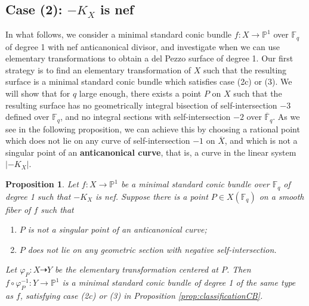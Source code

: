 \documentclass[a4paper, 11pt, reqno]{amsart}
\numberwithin{equation}{section} \numberwithin{figure}{section}
\newcommand{\term}[1]{\textbf{#1}}          %
\def \F {{\mathbb F}}
\def \P {{\mathbb P}}
\newcommand{\ra}{\rightarrow}
\newtheorem{proposition}[lemma]{Proposition}
\newtheorem{corollary}[lemma]{Corollary}
\theoremstyle{definition}
\numberwithin{lemma}{section}
\begin{document}


\subsection{Case (2): $-K_X$ is nef}

In what follows, we consider a minimal standard conic bundle $f \colon X \ra \P^1$ over $\F_q$ of degree 1 with nef anticanonical divisor, and investigate when we can use elementary transformations to obtain a del Pezzo surface of degree 1. Our first strategy is to find an elementary transformation of $X$ such that the resulting surface is a minimal standard conic bundle which satisfies case (2c) or (3). We will show that for $q$ large enough, there exists a point $P$ on $X$ such that the resulting surface has no geometrically integral bisection of self-intersection $-3$ defined over $\F_q$, and no integral sections with self-intersection $-2$ over $\overline{\F}_q$. As we see in the following proposition, we can achieve this by choosing a rational point which does not lie on any curve of self-intersection $-1$ on $\overline{X}$, and which is not a singular point of an \term{anticanonical curve}, that is, a curve in the linear system $|-K_X|$.

\begin{proposition}\label{prop:(3)(4)to(1)(2)}
    Let $f \colon X \ra \P^1$ be a minimal standard conic bundle over $\F_q$ of degree 1 such that $-K_X$ is nef. Suppose there is a point $P \in X(\F_q)$ on a smooth fiber of $f$ such that
    \begin{enumerate}[label=(\alph*)]
        \item $P$ is not a singular point of an anticanonical curve;
        \item $P$ does not lie on any geometric section with negative self-intersection.
    \end{enumerate}
    Let $\varphi_{\scriptscriptstyle P} \colon X \dashrightarrow Y$ be the elementary transformation centered at $P$. Then $f \circ \varphi_{\scriptscriptstyle P}^{-1} \colon Y \ra \P^1$ is a minimal standard conic bundle of degree 1 of the same type as $f$, satisfying case (2c) or (3) in Proposition \ref{prop:classificationCB}. 
\end{proposition}
\end{document}
